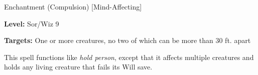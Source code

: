 \label{spell:Mass Hold Monster}

Enchantment (Compulsion) [Mind-Affecting]

\textbf{Level:} Sor/Wiz 9

\textbf{Targets:} One or more creatures, no two of which can be more than 30 ft. 
apart

This spell functions like \textit{hold person}, except that it affects multiple 
creatures and holds any living creature that fails its Will save.

